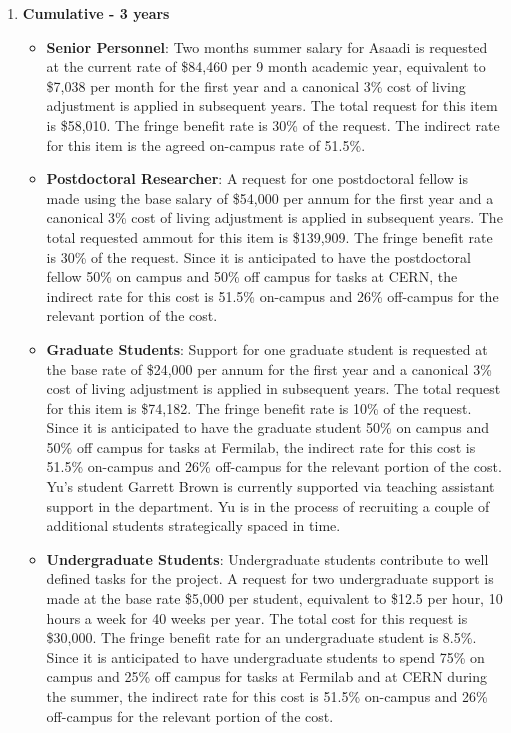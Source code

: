 \begin{enumerate}

\item{\bf Cumulative - 3 years}

\begin{itemize}[noitemsep,nolistsep]
\item{{\bf Senior Personnel}: Two months summer salary for Asaadi is requested at the current rate of \$84,460 per 9 month academic year, equivalent to \$7,038 per month for the first year and a canonical 3\% cost of living adjustment is applied in subsequent years.  The total request for this item is \$58,010. The fringe benefit rate is 30\% of the request.  The indirect rate for this item is the agreed on-campus rate of 51.5\%.}

\item {{\bf Postdoctoral Researcher}: A request for one postdoctoral fellow is made using the base salary of \$54,000 per annum for the first year and a canonical 3\% cost of living adjustment is applied in subsequent years.  The total requested ammout for this item is \$139,909. The fringe benefit rate is 30\% of the request.  Since it is anticipated to have the postdoctoral fellow 50\% on campus and 50\% off campus for tasks at CERN, the indirect rate for this cost is 51.5\% on-campus and 26\% off-campus for the relevant portion of the cost.} 

\item{{\bf Graduate Students}: Support for one graduate student is requested at the base rate of \$24,000 per annum for the first year and a canonical 3\% cost of living adjustment is applied in subsequent years. The total request for this item is \$74,182.  The fringe benefit rate is 10\% of the request.  Since it is anticipated to have the graduate student 50\% on campus and 50\% off campus for tasks at Fermilab, the indirect rate for this cost is 51.5\% on-campus and 26\% off-campus for the relevant portion of the cost.   Yu’s student Garrett Brown is currently supported via teaching assistant support in the department.   Yu is in the process of recruiting a couple of additional students strategically spaced in time.}

\item {{\bf Undergraduate Students}: Undergraduate students contribute to well defined tasks for the project.  A request for two undergraduate support is made at the base rate \$5,000 per student, equivalent to \$12.5 per hour, 10 hours a week for 40 weeks per year.  The total cost for this request is \$30,000.  The fringe benefit rate for an undergraduate student is 8.5\%.  Since it is anticipated to have undergraduate students to spend 75\% on campus and 25\% off campus for tasks at Fermilab and at CERN during the summer, the indirect rate for this cost is 51.5\% on-campus and 26\% off-campus for the relevant portion of the cost.}


\end{itemize}
\end{enumerate}
